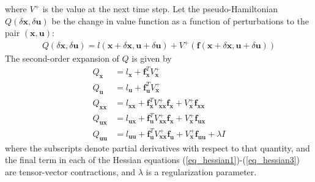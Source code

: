 \documentclass[journal ]{new-aiaa}
\newcommand{\state}{\ensuremath{\mathbf{x}}}
\newcommand{\control}{\ensuremath{\mathbf{u}}}
\begin{document}
where $V^+$ is the value at the next time step.
Let the pseudo-Hamiltonian $Q(\delta\state,\delta\control)$ be the change in value function as a function of perturbations to the pair $(\state,\control)$:
\begin{align}
Q(\delta\state,\delta\control) = l(\state+\delta\state,\control+\delta\control) + V^+(\mathbf{f}(\state+\delta\state,\control+\delta\control))
\end{align}
The second-order expansion of $ Q $ is given by
\begin{align}
Q_\state &= l_\state + \mathbf{f}_\state^T V^+_\state \\
Q_\control &= l_\control + \mathbf{f}_\control^T V^+_\state \\
Q_{\state\state} &= l_{\state\state} + \mathbf{f}_\state^T V^+_{\state\state}\mathbf{f}_\state + V^+_\state \mathbf{f}_{\state\state} \label{eq_hessian1}\\
Q_{\control\state} &= l_{\control\state} + \mathbf{f}_\control^T V^+_{\state\state}\mathbf{f}_\state + V^+_\state \mathbf{f}_{\control\state} \label{eq_hessian2}\\
Q_{\control\control} &= l_{\control\control} + \mathbf{f}_\control^T V^+_{\state\state}\mathbf{f}_\control + V^+_\state \mathbf{f}_{\control\control} +\lambda I \label{eq_hessian3}
\end{align}
where the subscripts denote partial derivatives with respect to that quantity, and the final term in each of the Hessian equations (\ref{eq_hessian1})-(\ref{eq_hessian3}) are tensor-vector contractions, and $ \lambda $ is a regularization parameter.  %
\end{document}
